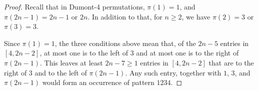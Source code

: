 \documentclass[
final
]{dmtcs-episciences}
\theoremstyle{definition}
\theoremstyle{remark}
\begin{document}
\begin{proof}
Recall that in Dumont-4 permutations, $\pi(1)=1$, and $\pi(2n-1)=2n-1$ or $2n$. In addition to that, for $n \ge 2$, we have $\pi(2)=3$ or $\pi(3)=3$. 

Since $\pi(1)=1$, the three conditions above mean that, of the $2n-5$ entries in $[4, 2n-2]$, at most one is to the left of $3$ and at most one is to the right of $\pi(2n-1)$. This leaves at least $2n-7\ge 1$ entries in $[4,2n-2]$ that are to the right of $3$ and to the left of $\pi(2n-1)$. Any such entry, together with $1$, $3$, and $\pi(2n-1)$ would form an occurrence of pattern $1234$.
%

\end{proof}
\end{document}
